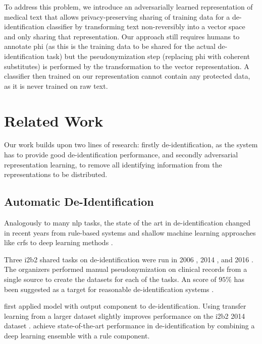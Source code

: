 %
To address this problem, we introduce an adversarially learned representation of medical text that allows privacy-preserving sharing of training data for a de-identification classifier
by transforming text non-reversibly into a vector space and only sharing that representation.
%
Our approach still requires humans to annotate \ac{phi} (as this is the training data to be shared for the actual de-identification task) but the pseudonymization step (replacing \ac{phi} with coherent substitutes) is performed by the transformation to the vector representation.
%
A classifier then trained on our representation cannot contain any protected data, as it is never trained on raw text.

\section{Related Work}\label{sec:related}
%
Our work builds upon two lines of research: firstly de-identification,
as the system has to provide good de-identification performance, and
secondly adversarial representation learning, to remove all identifying
information from the representations to be distributed.


\subsection{Automatic De-Identification}
%
Analogously to many \ac{nlp} tasks, the state of the art in de-identification changed in recent years from rule-based systems and shallow machine learning approaches like \acp{crf} \citep{uzuner2007evaluating,meystre2010automatic} to deep learning methods \citep{stubbs2017identification, dernoncourt2017identification, liu2017identification}.

%
Three i2b2 shared tasks on de-identification were run in 2006 \citep{uzuner2007evaluating}, 2014 \citep{stubbs2015automated}, and 2016 \citep{stubbs2017identification}.
%
The organizers performed manual pseudonymization on clinical records from a single source to create the datasets for each of the tasks.
%
An \fone score of $95\%$ has been suggested as a target for reasonable de-identification systems \citep{stubbs2015automated}.

%
\citet{dernoncourt2017identification} first applied  \citep{hochreiter1997long} model with  output component to de-identification.
%
Using transfer learning from a larger dataset slightly improves performance on the i2b2 2014 dataset \citep{lee2018transfer}.
%
\citet{liu2017identification} achieve state-of-the-art performance in de-identification by combining a deep learning ensemble with a rule component.

